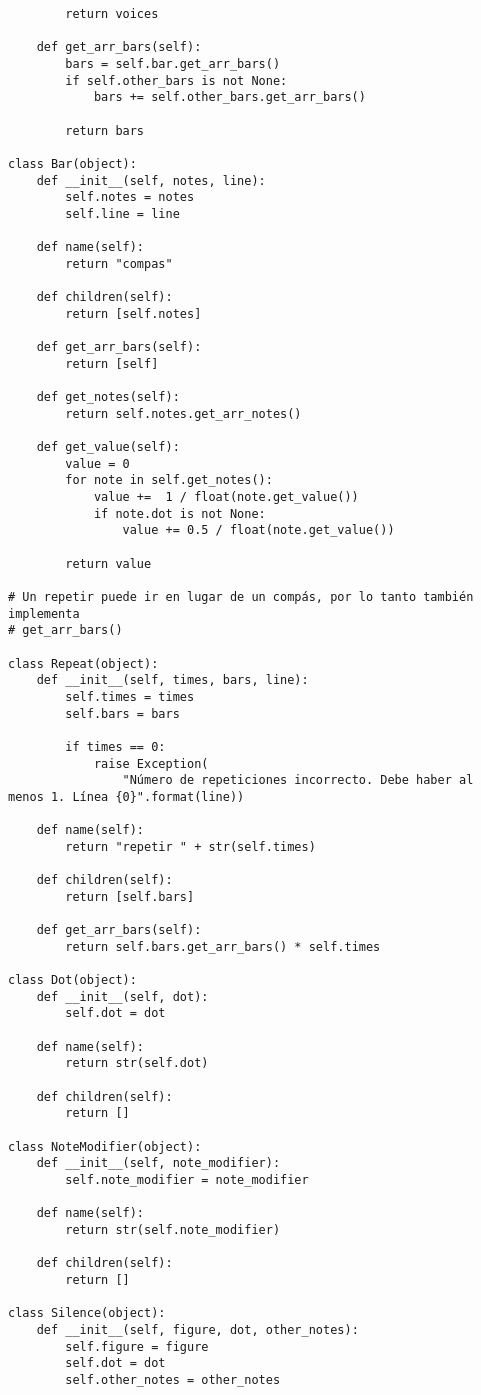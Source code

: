 \begin{verbatim}
        return voices

    def get_arr_bars(self):
        bars = self.bar.get_arr_bars()
        if self.other_bars is not None:
            bars += self.other_bars.get_arr_bars()

        return bars

class Bar(object):
    def __init__(self, notes, line):
        self.notes = notes
        self.line = line

    def name(self):
        return "compas"

    def children(self):
        return [self.notes]

    def get_arr_bars(self):
        return [self]

    def get_notes(self):
        return self.notes.get_arr_notes()

    def get_value(self):
        value = 0
        for note in self.get_notes():
            value +=  1 / float(note.get_value())
            if note.dot is not None:
                value += 0.5 / float(note.get_value())

        return value

# Un repetir puede ir en lugar de un compás, por lo tanto también implementa
# get_arr_bars()

class Repeat(object):
    def __init__(self, times, bars, line):
        self.times = times
        self.bars = bars

        if times == 0:
            raise Exception(
                "Número de repeticiones incorrecto. Debe haber al menos 1. Línea {0}".format(line))

    def name(self):
        return "repetir " + str(self.times)

    def children(self):
        return [self.bars]

    def get_arr_bars(self):
        return self.bars.get_arr_bars() * self.times

class Dot(object):
    def __init__(self, dot):
        self.dot = dot

    def name(self):
        return str(self.dot)

    def children(self):
        return []

class NoteModifier(object):
    def __init__(self, note_modifier):
        self.note_modifier = note_modifier

    def name(self):
        return str(self.note_modifier)

    def children(self):
        return []

class Silence(object):
    def __init__(self, figure, dot, other_notes):
        self.figure = figure
        self.dot = dot
        self.other_notes = other_notes


\end{verbatim}
